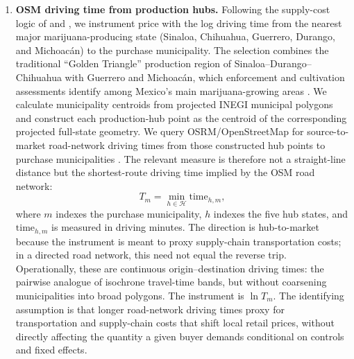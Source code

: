 \begin{enumerate}
  \item \textbf{OSM driving time from production hubs.}  Following the supply-cost logic of \citet{davis2016crowd} and \citet{halcoussis2017geo}, we instrument price with the log driving time from the nearest major marijuana-producing state (Sinaloa, Chihuahua, Guerrero, Durango, and Michoac\'{a}n) to the purchase municipality.  The selection combines the traditional ``Golden Triangle'' production region of Sinaloa--Durango--Chihuahua with Guerrero and Michoac\'{a}n, which enforcement and cultivation assessments identify among Mexico's main marijuana-growing areas \citep{medel2015cultivation,ndic2008ndta}.  We calculate municipality centroids from projected INEGI municipal polygons and construct each production-hub point as the centroid of the corresponding projected full-state geometry.  We query OSRM/OpenStreetMap for source-to-market road-network driving times from those constructed hub points to purchase municipalities \citep{openstreetmap2026,luxen2011osrm}.  The relevant measure is therefore not a straight-line distance but the shortest-route driving time implied by the OSM road network:
  \[
    T_m = \min_{h \in \mathcal{H}} \text{time}_{h,m},
  \]
  where $m$ indexes the purchase municipality, $h$ indexes the five hub states, and $\text{time}_{h,m}$ is measured in driving minutes.  The direction is hub-to-market because the instrument is meant to proxy supply-chain transportation costs; in a directed road network, this need not equal the reverse trip.  Operationally, these are continuous origin--destination driving times: the pairwise analogue of isochrone travel-time bands, but without coarsening municipalities into broad polygons.  The instrument is $\ln T_m$.  The identifying assumption is that longer road-network driving times proxy for transportation and supply-chain costs that shift local retail prices, without directly affecting the quantity a given buyer demands conditional on controls and fixed effects.


\end{enumerate}
